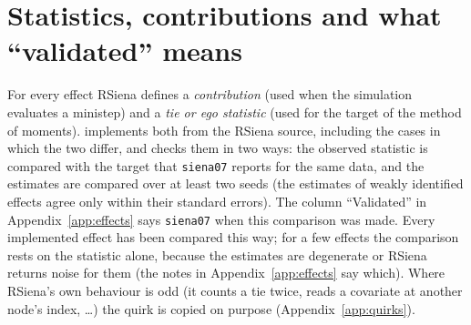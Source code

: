 \section{Statistics, contributions and what ``validated'' means}
For every effect RSiena defines a \emph{contribution} (used when the simulation evaluates a ministep) and a \emph{tie or ego statistic} (used for the target of the method of moments). \nwsaom{} implements both from the RSiena source, including the cases in which the two differ, and checks them in two ways: the observed statistic is compared with the target that \texttt{siena07} reports for the same data, and the estimates are compared over at least two seeds (the estimates of weakly identified effects agree only within their standard errors). The column ``Validated'' in Appendix~\ref{app:effects} says \texttt{siena07} when this comparison was made. Every implemented effect has been compared this way; for a few effects the comparison rests on the statistic alone, because the estimates are degenerate or RSiena returns noise for them (the notes in Appendix~\ref{app:effects} say which). Where RSiena's own behaviour is odd (it counts a tie twice, reads a covariate at another node's index, \ldots) the quirk is copied on purpose (Appendix~\ref{app:quirks}).

